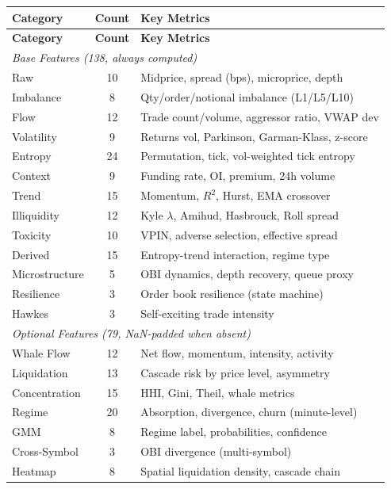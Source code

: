 \documentclass[11pt,a4paper]{article}
\begin{document}
\begin{longtable}{|l|c|l|}
\hline
\textbf{Category} & \textbf{Count} & \textbf{Key Metrics} \\
\hline
\endfirsthead
\hline
\textbf{Category} & \textbf{Count} & \textbf{Key Metrics} \\
\hline
\endhead
\multicolumn{3}{|l|}{\textit{Base Features (138, always computed)}} \\
\hline
Raw & 10 & Midprice, spread (bps), microprice, depth \\
Imbalance & 8 & Qty/order/notional imbalance (L1/L5/L10) \\
Flow & 12 & Trade count/volume, aggressor ratio, VWAP dev \\
Volatility & 9 & Returns vol, Parkinson, Garman-Klass, z-score \\
Entropy & 24 & Permutation, tick, vol-weighted tick entropy \\
Context & 9 & Funding rate, OI, premium, 24h volume \\
Trend & 15 & Momentum, $R^2$, Hurst, EMA crossover \\
Illiquidity & 12 & Kyle $\lambda$, Amihud, Hasbrouck, Roll spread \\
Toxicity & 10 & VPIN, adverse selection, effective spread \\
Derived & 15 & Entropy-trend interaction, regime type \\
Microstructure & 5 & OBI dynamics, depth recovery, queue proxy \\
Resilience & 3 & Order book resilience (state machine) \\
Hawkes & 3 & Self-exciting trade intensity \\
\hline
\multicolumn{3}{|l|}{\textit{Optional Features (79, NaN-padded when absent)}} \\
\hline
Whale Flow & 12 & Net flow, momentum, intensity, activity \\
Liquidation & 13 & Cascade risk by price level, asymmetry \\
Concentration & 15 & HHI, Gini, Theil, whale metrics \\
Regime & 20 & Absorption, divergence, churn (minute-level) \\
GMM & 8 & Regime label, probabilities, confidence \\
Cross-Symbol & 3 & OBI divergence (multi-symbol) \\
Heatmap & 8 & Spatial liquidation density, cascade chain \\
\hline
\end{longtable}
\end{document}
